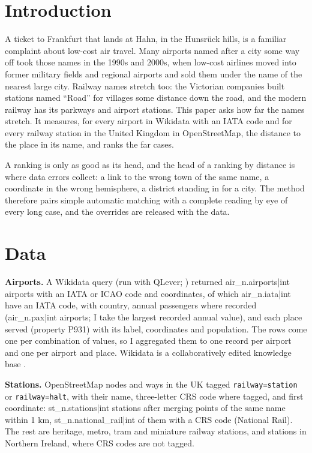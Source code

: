 \documentclass[11pt,a4paper]{article}
\begin{document}
\section{Introduction}
A ticket to Frankfurt that lands at Hahn, in the Hunsrück hills, is a familiar complaint about low-cost air travel. Many airports named after a city some way off took those names in the 1990s and 2000s, when low-cost airlines moved into former military fields and regional airports and sold them under the name of the nearest large city. Railway names stretch too: the Victorian companies built stations named ``Road'' for villages some distance down the road, and the modern railway has its parkways and airport stations. This paper asks how far the names stretch. It measures, for every airport in Wikidata with an IATA code and for every railway station in the United Kingdom in OpenStreetMap, the distance to the place in its name, and ranks the far cases.

A ranking is only as good as its head, and the head of a ranking by distance is where data errors collect: a link to the wrong town of the same name, a coordinate in the wrong hemisphere, a district standing in for a city. The method therefore pairs simple automatic matching with a complete reading by eye of every long case, and the overrides are released with the data.

\section{Data}
\textbf{Airports.} A Wikidata query (run with QLever; \citealt{bast2017}) returned {{air_n.airports|int}} airports with an IATA or ICAO code and coordinates, of which {{air_n.iata|int}} have an IATA code, with country, annual passengers where recorded ({{air_n.pax|int}} airports; I take the largest recorded annual value), and each place served (property P931) with its label, coordinates and population. The rows come one per combination of values, so I aggregated them to one record per airport and one per airport and place. Wikidata is a collaboratively edited knowledge base \citep{vrandecic2014}.

\textbf{Stations.} OpenStreetMap \citep{haklay2008} nodes and ways in the UK tagged \texttt{railway=station} or \texttt{railway=halt}, with their name, three-letter CRS code where tagged, and first coordinate: {{st_n.stations|int}} stations after merging points of the same name within 1 km, {{st_n.national_rail|int}} of them with a CRS code (National Rail). The rest are heritage, metro, tram and miniature railway stations, and stations in Northern Ireland, where CRS codes are not tagged.
\end{document}
